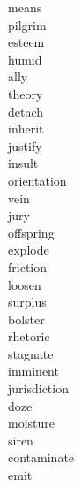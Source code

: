 \documentclass[a4paper, 10pt]{ctexart}
\begin{document}
\begin{multicols*}{2}
\begin{description}
\item[means]

\item[pilgrim]

\item[esteem]

\item[humid]

\item[ally]

\item[theory]

\item[detach]

\item[inherit]

\item[justify]

\item[insult]

\item[orientation]

\item[vein]

\item[jury]

\item[offspring]

\item[explode]

\item[friction]

\item[loosen]

\item[surplus]

\item[bolster]

\item[rhetoric]

\item[stagnate]

\item[imminent]

\item[jurisdiction]

\item[doze]

\item[moisture]

\item[siren]

\item[contaminate]

\item[emit]


\end{description}
\end{multicols*}
\end{document}
